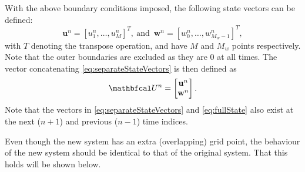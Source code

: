 With the above boundary conditions imposed, the following state vectors can be defined:
\begin{equation}
    \label{eq:separateStateVectors}
     \mathbf{u}^n = [u_1^n, \hdots, u_M^n]^T\!, \  \text{and} \ \; \mathbf{w}^n = [w_0^n, \hdots, w_{M_w-1}^n]^T,
\end{equation}
with $T$ denoting the transpose operation, and have $M$ and $M_{w}$ points respectively. Note that the outer boundaries are excluded as they are 0 at all times. The vector concatenating \eqref{eq:separateStateVectors} is then defined as 
\begin{equation}\label{eq:fullState}
    \U^n = \begin{bmatrix}
        \mathbf{u}^n \\
        \mathbf{w}^n
    \end{bmatrix}.
\end{equation}
Note that the vectors in \eqref{eq:separateStateVectors} and \eqref{eq:fullState} also exist at the next ($n+1$) and previous ($n-1$) time indices. 

Even though the new system has an extra (overlapping) grid point, the behaviour of the new system should be identical to that of the original system. That this holds will be shown below.

